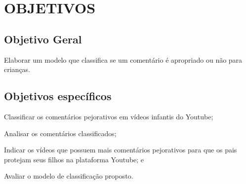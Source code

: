 \section{OBJETIVOS}

\subsection{Objetivo Geral}

Elaborar um modelo que classifica se um comentário é apropriado ou não para crianças.

\begin{comment}
Example inline comment
\end{comment}

\subsection{Objetivos específicos}

\begin{alineas}
    
    \item Classificar os comentários pejorativos em vídeos infantis do Youtube;
    \item Analisar os comentários classificados;
    \item Indicar os vídeos que possuem mais comentários pejorativos para que os pais protejam seus filhos na plataforma Youtube; e
    \item Avaliar o modelo de classificação proposto.

\end{alineas}
